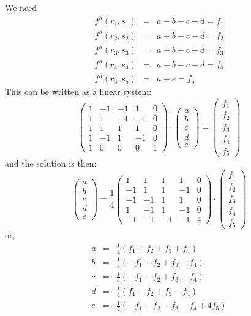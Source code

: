 We need
\begin{eqnarray}
f^h(r_1,s_1) &=& a-b-c+d  =f_1 \\
f^h(r_2,s_2) &=& a+b-c-d  =f_2 \\
f^h(r_3,s_3) &=& a+b+c+d  =f_3 \\
f^h(r_4,s_4) &=& a-b+c-d  =f_4 \\
f^h(r_5,s_5) &=& a      +e=f_5 
\end{eqnarray}
This can be written as a linear system: 
\[
\left(
\begin{array}{ccccc}
1 &-1 &-1 & 1 &0 \\
1 & 1 &-1 &-1 &0 \\
1 & 1 & 1 & 1 &0 \\
1 &-1 & 1 &-1 &0 \\
1 & 0 & 0 & 0 &1 
\end{array}
\right)
\cdot
\left(
\begin{array}{c}
a \\ b \\ c \\ d \\ e
\end{array}
\right)
=
\left(
\begin{array}{c}
f_1 \\ f_2 \\ f_3 \\ f_4 \\ f_5
\end{array}
\right)
\]
and the solution is then:
\[
\left(
\begin{array}{c}
a \\ b \\ c \\ d \\ e
\end{array}
\right)
=
\frac{1}{4}
\left(
\begin{array}{ccccc}
 1 & 1 &  1 & 1 &0\\
-1 & 1 &  1 &-1 &0\\
-1 &-1 &  1 & 1 &0\\
 1 &-1 &  1 &-1 &0\\
-1 &-1 & -1 &-1 &4
\end{array}
\right)
\cdot
\left(
\begin{array}{c}
f_1 \\ f_2 \\ f_3 \\ f_4 \\ f_5
\end{array}
\right)
\]
or, 
\begin{eqnarray}
a &=& \frac{1}{4}( f_1 + f_2 +f_3 +f_4) \\
b &=& \frac{1}{4}(-f_1 + f_2 +f_3 -f_4) \\
c &=& \frac{1}{4}(-f_1 - f_2 +f_3 +f_4) \\
d &=& \frac{1}{4}( f_1 - f_2 +f_3 -f_4) \\
e &=& \frac{1}{4}(-f_1 - f_2 -f_3 -f_4 + 4f_5) 
\end{eqnarray}
